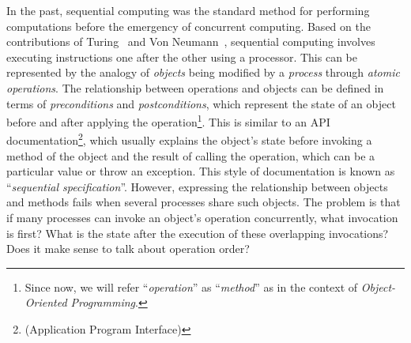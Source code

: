 In the past, sequential computing was the standard method for performing computations before the emergency of concurrent computing. Based on the contributions of  Turing~\cite{DBLP_journals_x_Turing37} and Von Neumann~\cite{DBLP_journals_annals_Neumann93}, sequential computing involves executing instructions one after the other using a processor. This can be represented by the analogy of \textit{objects} being modified by a \textit{process} through \textit{atomic operations}. The relationship between operations and objects can be defined in terms of \textit{preconditions} and \textit{postconditions}, which represent the state of an object before and after applying the operation\footnote{Since now, we will refer ``\textit{operation}'' as ``\textit{method}'' as in the context of \textit{Object-Oriented Programming}.}. This is similar to an API documentation\footnote{(Application Program Interface)}, which usually explains the object's state before invoking a method of the object and the result of calling the operation, which can be a particular value or throw an exception. This style of documentation is known as ``\textit{sequential specification}''.
However, expressing the relationship between objects and methods fails when several processes share such objects. The problem is that if many processes can invoke an object's operation concurrently, what invocation is first? What is the state after the execution of these overlapping invocations? Does it make sense to talk about operation order?

